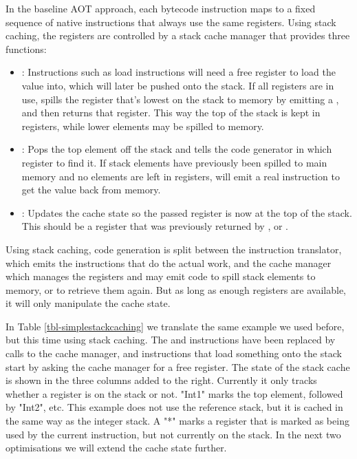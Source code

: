 In the baseline AOT approach, each bytecode instruction maps to a fixed sequence of native instructions that always use the same registers. Using stack caching, the registers are controlled by a stack cache manager that provides three functions:
\begin{itemize}
    \item {}: Instructions such as load instructions will need a free register to load the value into, which will later be pushed onto the stack. If all registers are in use,  spills the register that's lowest on the stack to memory by emitting a , and then returns that register. This way the top of the stack is kept in registers, while lower elements may be spilled to memory.
    \item {}: Pops the top element off the stack and tells the code generator in which register to find it. If stack elements have previously been spilled to main memory and no  elements are left in registers,  will emit a real  instruction to get the value back from memory.
    \item {}: Updates the cache state so the passed register is now at the top of the stack. This should be a register that was previously returned by , or .
\end{itemize}

Using stack caching, code generation is split between the instruction translator, which emits the instructions that do the actual work, and the cache manager which manages the registers and may emit code to spill stack elements to memory, or to retrieve them again. But as long as enough registers are available, it will only manipulate the cache state.

In Table \ref{tbl-simplestackcaching} we translate the same example we used before, but this time using stack caching. The  and  instructions have been replaced by calls to the cache manager, and instructions that load something onto the stack start by asking the cache manager for a free register. The state of the stack cache is shown in the three columns added to the right. Currently it only tracks whether a register is on the stack or not. "Int1" marks the top element, followed by "Int2", etc. This example does not use the reference stack, but it is cached in the same way as the integer stack. A "*" marks a register that is marked as being used by the current instruction, but not currently on the stack. In the next two optimisations we will extend the cache state further.
 
